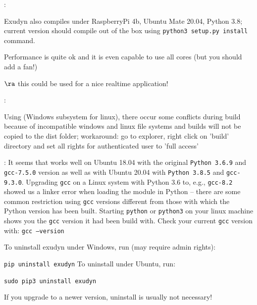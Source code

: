 \noindent {}:
\bi
  \item Exudyn also compiles under RaspberryPi 4b, Ubuntu Mate 20.04, Python 3.8; current version should compile out of the box using \texttt{python3 setup.py install} command.
  \item Performance is quite ok and it is even capable to use all cores (but you should add a fan!)
  \item $\ra$ this could be used for a nice realtime application!
\ei

\noindent {}:
\bi
  \item Using  (Windows subsystem for linux), there occur some conflicts during build because of incompatible windows and linux file systems and builds will not be copied to the dist folder; workaround: go to explorer, right click on 'build' directory and set all rights for authenticated user to 'full access'
  \item {}: It seems that \codeName works well on Ubuntu 18.04 with the original \texttt{Python 3.6.9} and \texttt{gcc-7.5.0} version as well as with Ubuntu 20.04 with \texttt{Python 3.8.5} and \texttt{gcc-9.3.0}. Upgrading \texttt{gcc} on a Linux system with Python 3.6 to, e.g., \texttt{gcc-8.2} showed us a linker error when loading the \codeName module in Python -- there are some common restriction using \texttt{gcc} versions different from those with which the Python version has been built. Starting \texttt{python} or \texttt{python3} on your linux machine shows you the \texttt{gcc} version it had been build with. Check your current \texttt{gcc} version with: \texttt{gcc --version}
\ei


To uninstall exudyn under Windows, run (may require admin rights):
\bi
  \item[] \texttt{pip uninstall exudyn}
\ei
\noindent To uninstall under Ubuntu, run:
\bi
  \item[] \texttt{sudo pip3 uninstall exudyn}
\ei

If you upgrade to a newer version, uninstall is usually not necessary!
%

